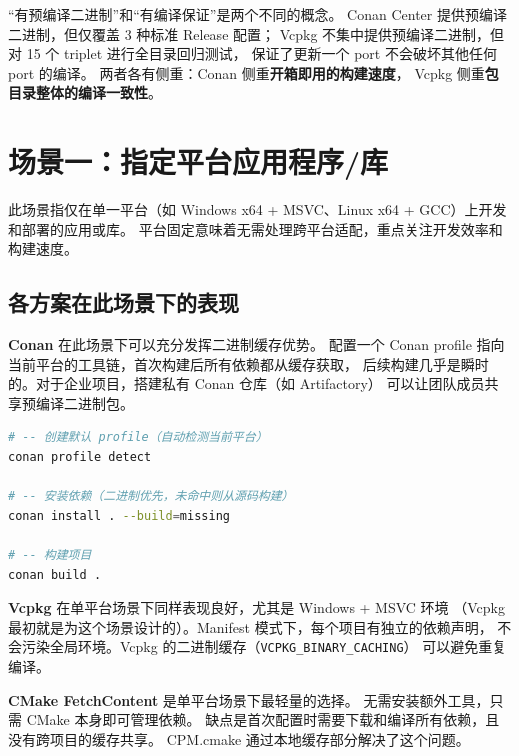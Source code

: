\documentclass[12pt,a4paper,fontset=fandol]{ctexbook}
\begin{document}
\begin{note}[ title={关键区分}]
``有预编译二进制''和``有编译保证''是两个不同的概念。
Conan Center 提供预编译二进制，但仅覆盖 3 种标准 Release 配置；
Vcpkg 不集中提供预编译二进制，但对 15 个 triplet 进行全目录回归测试，
保证了更新一个 port 不会破坏其他任何 port 的编译。
两者各有侧重：Conan 侧重\textbf{开箱即用的构建速度}，
Vcpkg 侧重\textbf{包目录整体的编译一致性}。
\end{note}

\section{场景一：指定平台应用程序/库}

此场景指仅在单一平台（如 Windows x64 + MSVC、Linux x64 + GCC）上开发和部署的应用或库。
平台固定意味着无需处理跨平台适配，重点关注开发效率和构建速度。

\subsection{各方案在此场景下的表现}

\textbf{Conan} 在此场景下可以充分发挥二进制缓存优势。
配置一个 Conan profile 指向当前平台的工具链，首次构建后所有依赖都从缓存获取，
后续构建几乎是瞬时的。对于企业项目，搭建私有 Conan 仓库（如 Artifactory）
可以让团队成员共享预编译二进制包。

\begin{lstlisting}[language=Bash, caption={Conan 单平台使用流程}]
# -- 创建默认 profile（自动检测当前平台）
conan profile detect

# -- 安装依赖（二进制优先，未命中则从源码构建）
conan install . --build=missing

# -- 构建项目
conan build .
\end{lstlisting}

\textbf{Vcpkg} 在单平台场景下同样表现良好，尤其是 Windows + MSVC 环境
（Vcpkg 最初就是为这个场景设计的）。Manifest 模式下，每个项目有独立的依赖声明，
不会污染全局环境。Vcpkg 的二进制缓存（\texttt{VCPKG\_BINARY\_CACHING}）
可以避免重复编译。

\textbf{CMake FetchContent} 是单平台场景下最轻量的选择。
无需安装额外工具，只需 CMake 本身即可管理依赖。
缺点是首次配置时需要下载和编译所有依赖，且没有跨项目的缓存共享。
CPM.cmake 通过本地缓存部分解决了这个问题。
\end{document}
